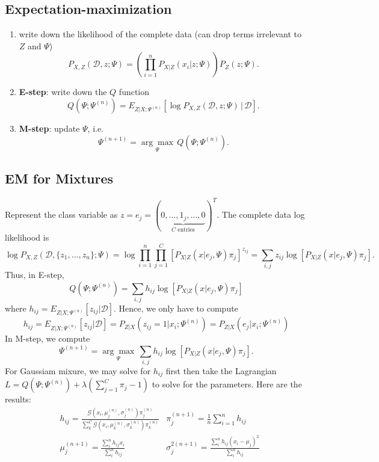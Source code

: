 \documentclass{article}
\newenvironment{topic}[1]{\subsection*{#1}}{}
\newcommand*{\G}{\mathcal{G}}
\newcommand*{\D}{\mathcal{D}}
\begin{document}
\pagebreak

\begin{topic}{Expectation-maximization}
    \begin{enumerate}
        \item write down the likelihood of the complete data (can drop terms irrelevant to $Z$ and $\Psi$)
                \[
                    P_{X, Z}(\D, z; \Psi) = \left(\prod_{i = 1}^n P_{X| Z}(x_i| z; \Psi)\right)P_Z(z; \Psi).
                \]
        \item \textbf{E-step}: write down the $Q$ function
                \[
                    Q(\Psi; \Psi^{(n)}) = E_{Z|X;\Psi^{(n)}}[\log P_{X, Z}(\D, z; \Psi) \, | \, \D].
                \]
        \item \textbf{M-step}: update $\Psi$, i.e.
                \[
                    \Psi^{(n + 1)} = \underset{\Psi}{\arg \max} \, Q(\Psi; \Psi^{(n)}).
                \]
    \end{enumerate}
\end{topic}

\begin{topic}{EM for Mixtures}
    Represent the class variable as $z = e_j = (\underbrace{0, \ldots, 1_j, \ldots, 0}_{C \text{ entries}})^T$. The complete data log likelihood is 
    \[
        \log P_{X, Z}(\D, \{z_1, \dots, z_n\}; \Psi) = \log \prod_{i = 1}^n \prod_{j = 1}^C [P_{X|Z}(x|e_j, \Psi)\pi_j]^{z_{ij}} = \sum_{i, j} z_{ij} \log [P_{X|Z}(x|e_j, \Psi)\pi_j].
    \]
    Thus, in E-step,
    \[
        Q(\Psi; \Psi^{(n)}) = \sum_{i, j} h_{ij}\log [P_{X|Z}(x|e_j, \Psi)\pi_j]
    \]
    where $h_{ij} = E_{Z|X;\Psi^{(n)}}[z_{ij}|\D]$. Hence, we only have to compute
    \[
        h_{ij} = E_{Z|X;\Psi^{(n)}}[z_{ij}|\D] = P_{Z|X}(z_{ij} = 1|x_i; \Psi^{(n)}) = P_{Z|X}(e_j|x_i; \Psi^{(n)})
    \]
    In M-step, we compute
    \[
        \Psi^{(n + 1)} = \underset{\Psi}{\arg \max} \, \sum_{i, j} h_{ij}\log [P_{X|Z}(x|e_j, \Psi)\pi_j].
    \]
    For Gaussiam mixure, we may solve for $h_{ij}$ first then take the Lagrangian $L = Q(\Psi; \Psi^{(n)}) + \lambda\left(\sum_{j = 1}^C \pi_j - 1\right)$ to solve for the parameters. Here are the results:
    \begin{align*}
        &h_{ij} = \frac{\G\left(x_i, \mu_j^{(n)}, \sigma_j^{(n)}\right)\pi_j^{(n)}}{\sum_k^C \G\left(x_i, \mu_k^{(n)}, \sigma_k^{(n)}\right)\pi_k^{(n)}}
        &\pi_j^{(n + 1)} = \frac{1}{n}\sum_{i = 1}^n h_{ij} \\
        &\mu_j^{(n + 1)} = \frac{\sum_{i}^n h_{ij}x_i}{\sum_{i}^n h_{ij}}
        &\sigma^{2(n + 1)}_j = \frac{\sum_{i}^n h_{ij}(x_i - \mu_j)^2}{\sum_{i}^n h_{ij}}
    \end{align*}
\end{topic}
\end{document}

